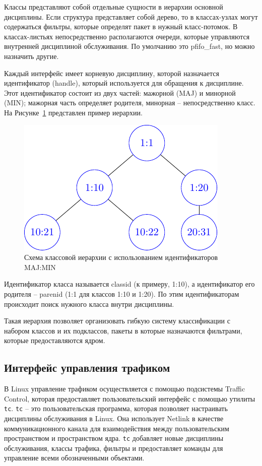 	Классы представляют собой отдельные сущности в иерархии основной дисциплины.
	Если структура представляет собой дерево, то в классах-узлах могут содержаться
	фильтры, которые определят пакет в нужный класс-потомок. В классах-листьях
	непосредственно располагаются очереди, которые управляются внутренней дисциплиной
	обслуживания. По умолчанию это pfifo\_fast, но можно назначить другие. 

	Каждый интерфейс имеет корневую дисциплину, которой
	назначается идентификатор (handle), который используется для обращения к дисциплине.
	Этот идентификатор состоит из двух частей: мажорной (MAJ) и минорной (MIN); мажорная
	часть определяет родителя, минорная -- непосредственно класс. На Рисунке~\ref{pic:clheirh}
	представлен пример иерархии.

	\begin{figure}[ht!]
		\centering
		\includegraphics[scale=1.3]{./pdfimages/class_hierh.pdf}
		\caption{Схема классовой иерархии с использованием идентификаторов MAJ:MIN}
		\label{pic:clheirh}
	\end{figure}

	Идентификатор класса называется classid (к примеру, 1:10),
	а идентификатор его родителя -- parenid (1:1 для классов 1:10 и 1:20). По этим
	идентификаторам происходит поиск нужного класса внутри дисциплины.

	Такая иерархия позволяет организовать гибкую систему классификации с набором классов
	и их подклассов, пакеты в которые назначаются фильтрами, которые предоставляются ядром.

	\subsection{Интерфейс управления трафиком}

	В Linux управление трафиком осуществляется с помощью подсистемы Traffic Control,
	которая предоставляет пользовательский интерфейс с помощью утилиты \texttt{tc}.
	\texttt{tc} -- это пользовательская программа, которая позволяет настраивать
	дисциплины обслуживания в Linux. Она использует Netlink в качестве
	коммуникационного канала для взаимодействия между пользовательским
	пространством и пространством ядра. \texttt{tc} добавляет новые дисциплины
	обслуживания, классы трафика, фильтры и предоставляет команды для
	управление всеми обозначенными объектами.\cite{tcpip}


